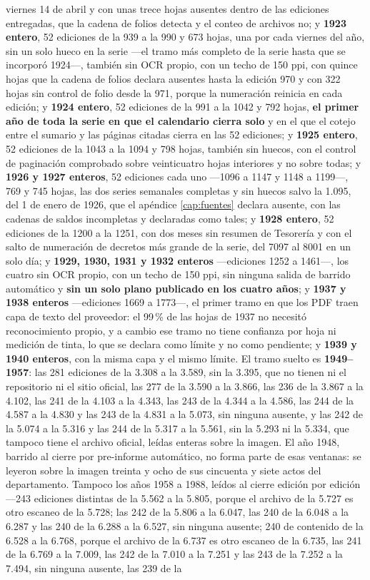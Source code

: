 viernes 14 de abril y con unas trece hojas ausentes dentro de las ediciones entregadas, que la cadena de folios detecta y el conteo de archivos no; y \textbf{1923 entero}, 52 ediciones de la 939 a la 990 y 673 hojas, una por cada viernes del año, sin un solo hueco en la serie ---el tramo más completo de la serie hasta que se incorporó 1924---, también sin OCR propio, con un techo de 150 ppi, con quince hojas que la cadena de folios declara ausentes hasta la edición 970 y con 322 hojas sin control de folio desde la 971, porque la numeración reinicia en cada edición; y \textbf{1924 entero}, 52 ediciones de la 991 a la 1042 y 792 hojas, \textbf{el primer año de toda la serie en que el calendario cierra solo} y en el que el cotejo entre el sumario y las páginas citadas cierra en las 52 ediciones; y \textbf{1925 entero}, 52 ediciones de la 1043 a la 1094 y 798 hojas, también sin huecos, con el control de paginación comprobado sobre veinticuatro hojas interiores y no sobre todas; y \textbf{1926 y 1927 enteros}, 52 ediciones cada uno ---1096 a 1147 y 1148 a 1199---, 769 y 745 hojas, las dos series semanales completas y sin huecos salvo la 1.095, del 1 de enero de 1926, que el apéndice \ref{cap:fuentes} declara ausente, con las cadenas de saldos incompletas y declaradas como tales; y \textbf{1928 entero}, 52 ediciones de la 1200 a la 1251, con dos meses sin resumen de Tesorería y con el salto de numeración de decretos más grande de la serie, del 7097 al 8001 en un solo día; y \textbf{1929, 1930, 1931 y 1932 enteros} ---ediciones 1252 a 1461---, los cuatro sin OCR propio, con un techo de 150 ppi, sin ninguna salida de barrido automático y \textbf{sin un solo plano publicado en los cuatro años}; y \textbf{1937 y 1938 enteros} ---ediciones 1669 a 1773---, el primer tramo en que los PDF traen capa de texto del proveedor: el 99\,\% de las hojas de 1937 no necesitó reconocimiento propio, y a cambio ese tramo no tiene confianza por hoja ni medición de tinta, lo que se declara como límite y no como pendiente; y \textbf{1939 y 1940 enteros}, con la misma capa y el mismo límite. El tramo suelto es \textbf{1949--1957}: las 281 ediciones de la 3.308 a la 3.589, sin la 3.395, que no tienen ni el repositorio ni el sitio oficial, las 277 de la 3.590 a la 3.866, las 236 de la 3.867 a la 4.102, las 241 de la 4.103 a la 4.343, las 243 de la 4.344 a la 4.586, las 244 de la 4.587 a la 4.830 y las 243 de la 4.831 a la 5.073, sin ninguna ausente, y las 242 de la 5.074 a la 5.316 y las 244 de la 5.317 a la 5.561, sin la 5.293 ni la 5.334, que tampoco tiene el archivo oficial, leídas enteras sobre la imagen. El año 1948, barrido al cierre por pre-informe automático, no forma parte de esas ventanas: se leyeron sobre la imagen treinta y ocho de sus cincuenta y siete actos del departamento. Tampoco los años 1958 a 1988, leídos al cierre edición por edición ---243 ediciones distintas de la 5.562 a la 5.805, porque el archivo de la 5.727 es otro escaneo de la 5.728; las 242 de la 5.806 a la 6.047, las 240 de la 6.048 a la 6.287 y las 240 de la 6.288 a la 6.527, sin ninguna ausente; 240 de contenido de la 6.528 a la 6.768, porque el archivo de la 6.737 es otro escaneo de la 6.735, las 241 de la 6.769 a la 7.009, las 242 de la 7.010 a la 7.251 y las 243 de la 7.252 a la 7.494, sin ninguna ausente, las 239 de la 